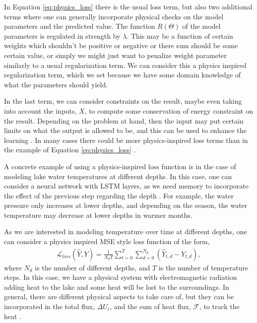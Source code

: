 \documentclass[12pt,a4paper]{article} %
\numberwithin{equation}{section}
\newcommand{\paa}[1]{\left(#1\right)}
\begin{document}
			In Equation \ref{eq:physics_loss} there is the usual loss term, but also two additional terms where one can generally incorporate physical checks on the model parameters and the predicted value. The function $R(\Theta)$ of the model parameters is regulated in strength by $\lambda$. This may be a function of certain weights which shouldn't be positive or negative or there sum should be some certain value, or simply we might just want to penalize weight parameter similarly to a usual regularization term. We can consider this a physics inspired regularization term, which we set because we have some domain knowledge of what the parameters should yield.
			
			In the last term, we can consider constraints on the result, maybe even taking into account the inputs, $X$, to compute some conservation of energy constraint on the result. Depending on the problem at hand, then the input may put certain limits on what the output is allowed to be, and this can be used to enhance the learning \cite{stewart:2016}. In many cases there could be more physics-inspired loss terms than in the example of Equation \ref{eq:physics_loss}  \cite{fukami:2019}.
			
			A concrete example of using a physics-inspired loss function is in the case of modeling lake water temperatures at different depths. In this case, one can consider a neural network with LSTM layers, as we need memory to incorporate the effect of the previous step regarding the depth \cite{jia:2018, read:2019}. For example, the water pressure only increases at lower depths, and depending on the season, the water temperature may decrease at lower depths in warmer months.
			
			As we are interested in modeling temperature over time at different depths, one can consider a physics inspired MSE style loss function of the form,
			\begin{gather}
				\mathcal{L}_{loss}(\hat{Y}, Y) = \frac{1}{N_d T} \sum_{t=0}^T \sum_{d=0}^{N_d} \paa{\hat{Y}_{t,d} - Y_{t,d}},
			\end{gather}
			where $N_d$ is the number of different depths, and $T$ is the number of temperature steps. In this case, we have a physical system with electromagnetic radiation adding heat to the lake and some heat will be lost to the surroundings. In general, there are different physical aspects to take care of, but they can be incorporated in the total flux, $\Delta U_t$, and the sum of heat flux, $\mathcal{F}$, to track the heat \cite{jia:2018}.
			
\end{document}
